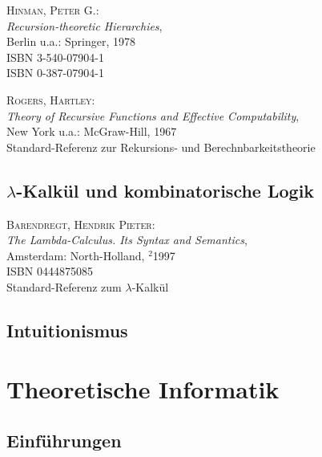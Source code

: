 \begin{description}
  

\item \textsc{Hinman, Peter G.}: \\
  \textit{Recursion-theoretic Hierarchies}, \\
  Berlin u.a.: Springer, 1978 \\
  ISBN 3-540-07904-1 \\
  ISBN 0-387-07904-1
  

\item \textsc{Rogers, Hartley}: \\
  \textit{Theory of Recursive Functions and Effective Computability}, \\
  New York u.a.: McGraw-Hill, 1967 \\
  Standard-Referenz zur Rekursions- und Berechnbarkeitstheorie

\end{description}

\subsection{$\lambda$-Kalk\"ul und kombinatorische Logik}

\begin{description}
  

\item \textsc{Barendregt, Hendrik Pieter}: \\
  \textit{The Lambda-Calculus. Its Syntax and Semantics}, \\
  Amsterdam: North-Holland, $^2$1997 \\
  ISBN 0444875085 \\
  Standard-Referenz zum $\lambda$-Kalk\"ul

\end{description}

\subsection{Intuitionismus}


\section{Theoretische Informatik}

\subsection{Einf\"uhrungen}

